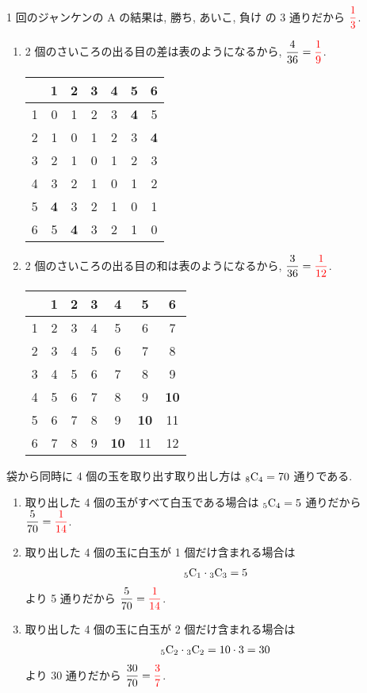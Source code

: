 1 回のジャンケンの A の結果は, 勝ち, あいこ, 負け の 3 通りだから $\textcolor{red}{\dfrac{1}{3}}$.

\begin{enumerate}
	\item{
		2 個のさいころの出る目の差は表のようになるから, $\dfrac{4}{36} = \textcolor{red}{\dfrac{1}{9}}$.
		\begin{table}[H]
			\centering
			\begin{tabular}{c|cccccc}
				  & 1 & 2 & 3 & 4 & 5 & 6 \\ \hline
				1 & 0 & 1 & 2 & 3 & {\textbf{4}} & 5 \\
				2 & 1 & 0 & 1 & 2 & 3 & {\textbf{4}} \\
				3 & 2 & 1 & 0 & 1 & 2 & 3 \\
				4 & 3 & 2 & 1 & 0 & 1 & 2 \\
				5 & {\textbf{4}} & 3 & 2 & 1 & 0 & 1 \\
				6 & 5 & {\textbf{4}} & 3 & 2 & 1 & 0 \\
			\end{tabular}
		\end{table}
	}
	\item{
		2 個のさいころの出る目の和は表のようになるから, $\dfrac{3}{36} = \textcolor{red}{\dfrac{1}{12}}$.
		\begin{table}[H]
			\centering
			\begin{tabular}{c|cccccc}
				  & 1 & 2 & 3 & 4 & 5 & 6 \\ \hline
				1 & 2 & 3 & 4 & 5 & 6 & 7 \\
				2 & 3 & 4 & 5 & 6 & 7 & 8 \\
				3 & 4 & 5 & 6 & 7 & 8 & 9 \\
				4 & 5 & 6 & 7 & 8 & 9 & {\textbf{10}} \\
				5 & 6 & 7 & 8 & 9 & {\textbf{10}} & 11 \\
				6 & 7 & 8 & 9 & {\textbf{10}} & 11 & 12 \\
			\end{tabular}
		\end{table}
	}
\end{enumerate}

袋から同時に 4 個の玉を取り出す取り出し方は ${{}_{8}\mathrm{C}_{4}} = 70$ 通りである.
\begin{enumerate}
	\item{
		取り出した 4 個の玉がすべて白玉である場合は ${{}_{5}\mathrm{C}_{4}} = 5$ 通りだから $\dfrac{5}{70} = \textcolor{red}{\dfrac{1}{14}}$.
	}
	\item{
		取り出した 4 個の玉に白玉が 1 個だけ含まれる場合は
		\begin{align}
			{{}_{5}\mathrm{C}_{1}}\cdot{{}_{3}\mathrm{C}_{3}} = 5
		\end{align}
		より 5 通りだから $\dfrac{5}{70} = \textcolor{red}{\dfrac{1}{14}}$.
	}
	\item{
		取り出した 4 個の玉に白玉が 2 個だけ含まれる場合は
		\begin{align}
			{{}_{5}\mathrm{C}_{2}}\cdot{{}_{3}\mathrm{C}_{2}} = 10\cdot3 = 30
		\end{align}
		より 30 通りだから $\dfrac{30}{70} = \textcolor{red}{\dfrac{3}{7}}$.
	}
\end{enumerate}

